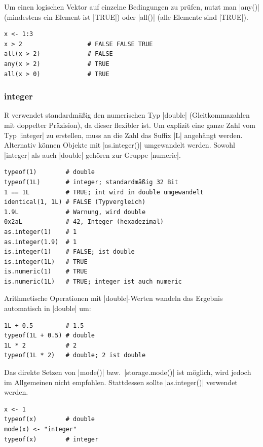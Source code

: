 \documentclass[10pt,twocolumn]{scrartcl}
\renewcommand{\lstinline}{\mycoloredinline}
\begin{document}
Um einen logischen Vektor auf einzelne Bedingungen zu prüfen, nutzt man \lstinline|any()| (mindestens ein Element ist \lstinline|TRUE|) oder \lstinline|all()| (alle Elemente sind \lstinline|TRUE|).

\begin{lstlisting}
x <- 1:3
x > 2                  # FALSE FALSE TRUE
all(x > 2)             # FALSE
any(x > 2)             # TRUE
all(x > 0)             # TRUE
\end{lstlisting}


\subsubsection{integer}

R verwendet standardmäßig den numerischen Typ \lstinline|double| (Gleitkommazahlen mit doppelter Präzision), da dieser flexibler ist. Um explizit eine ganze Zahl vom Typ \lstinline|integer| zu erstellen, muss an die Zahl das Suffix \lstinline|L| angehängt werden. Alternativ können Objekte mit \lstinline|as.integer()| umgewandelt werden. Sowohl \lstinline|integer| als auch \lstinline|double| gehören zur Gruppe \lstinline|numeric|.

\begin{lstlisting}
typeof(1)        # double
typeof(1L)       # integer; standardmäßig 32 Bit
1 == 1L          # TRUE; int wird in double umgewandelt
identical(1, 1L) # FALSE (Typvergleich)
1.9L             # Warnung, wird double
0x2aL            # 42, Integer (hexadezimal)
as.integer(1)    # 1
as.integer(1.9)  # 1
is.integer(1)    # FALSE; ist double
is.integer(1L)   # TRUE
is.numeric(1)    # TRUE
is.numeric(1L)   # TRUE; integer ist auch numeric
\end{lstlisting}

Arithmetische Operationen mit \lstinline|double|-Werten wandeln das Ergebnis automatisch in \lstinline|double| um:
\begin{lstlisting}
1L + 0.5         # 1.5
typeof(1L + 0.5) # double
1L * 2           # 2
typeof(1L * 2)   # double; 2 ist double
\end{lstlisting}

Das direkte Setzen von \lstinline|mode()| bzw.\ \lstinline|storage.mode()| ist möglich, wird jedoch im Allgemeinen nicht empfohlen. Stattdessen sollte \lstinline|as.integer()| verwendet werden.

\begin{lstlisting}
x <- 1
typeof(x)        # double
mode(x) <- "integer"
typeof(x)        # integer
\end{lstlisting}
\end{document}

